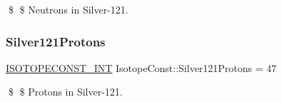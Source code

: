 \$ \$ Neutrons in Silver-\/121. \mbox{\label{group___isotope_const-_silver-_ag121_gae5d85403817e9903e72ba53b1bccdc91}} 
\subsubsection{\texorpdfstring{Silver121\+Protons}{Silver121Protons}}
{\footnotesize\ttfamily \mbox{\hyperlink{group___isotope_const-_macros_ga5f18360b3e99483a35c32d789e62621c}{I\+S\+O\+T\+O\+P\+E\+C\+O\+N\+S\+T\+\_\+\+I\+NT}} Isotope\+Const\+::\+Silver121\+Protons = 47}

\$ \$ Protons in Silver-\/121. 